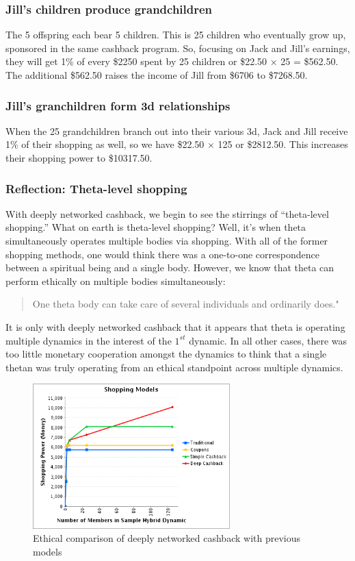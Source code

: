 \documentclass{article}%
\begin{document}
\subsubsection{Jill's children produce grandchildren}

    The 5 offspring each bear 5 children. This is 25 children who eventually grow up, sponsored in the same cashback program. So, focusing on Jack and Jill's earnings, they will get 1\% of every \$2250 spent by 25 children or \$22.50 $\times$ 25 = \$562.50. The additional \$562.50 raises the income of Jill from \$6706 to \$7268.50.

\subsubsection{Jill's granchildren form 3d relationships}

    When the 25 grandchildren branch out into their various 3d, Jack and Jill receive 1\% of their shopping as well, so we have \$22.50 $\times$ 125 or \$2812.50. This increases their shopping power to \$10317.50.
    
\subsubsection{Reflection: Theta-level shopping}

With deeply networked cashback, we begin to see the stirrings of ``theta-level shopping.'' What on earth is theta-level shopping? Well, it's when theta simultaneously operates multiple bodies via shopping. With all of the former shopping methods, one would think there was a one-to-one correspondence between a spiritual being and a single body. However, we know that theta can perform ethically on multiple bodies simultaneously: 


\begin{quotation}
One theta body can take care of several individuals and ordinarily does." 
\end{quotation}

It is only with deeply networked cashback that it appears that theta is operating multiple dynamics in the interest of the $1^{st}$ dynamic. In all other cases, there was too little monetary cooperation amongst the dynamics to think that a single thetan was truly operating from an ethical standpoint across multiple dynamics.

\begin{figure}[h]
\centering
	\includegraphics[width=3in]{shopping-deep-cashback.png}
	\caption{Ethical comparison of deeply networked cashback with previous models}
\end{figure}
\end{document}

